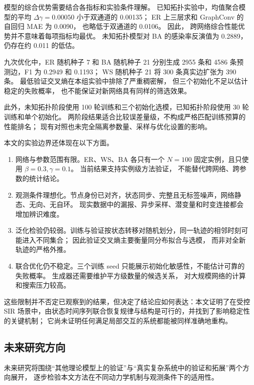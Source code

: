 模型的综合优势需要结合各指标和实验条件理解。
已知拓扑实验中，均值聚合模型的平均 $\Delta\gamma=0.00050$ 小于双通道的 0.00135；
ER 上三层求和 GraphConv 的自回归 MAE 为 0.0090，
也略低于双通道的 0.0106。
因此，
跨网络综合性能优势并不意味着每项指标均最优。
未知拓扑模型对 BA 的感染率反演值为 0.2889，
仍存在约 0.011 的低估。

九次优化中，ER 随机种子 7 和 BA 随机种子 21 分别生成 2955 条和 4586 条预测边，F1 为 0.2949 和 0.1193；
WS 随机种子 21 将 300 条真实边扩张为 390 条。
最低验证交叉熵在本组实验中排除了严重稠密解，
但三个初始化不足以估计稳定的失败概率，
也不能保证对新网络具有同样的筛选效果。

此外，未知拓扑阶段使用 100 轮训练和三个初始化选模，已知拓扑阶段使用 30 轮训练和单个初始化。
两阶段结果适合比较误差量级，不构成严格匹配训练预算的性能排名；
现有对照也未完全隔离参数量、采样与优化设置的影响。

本文的实验边界还体现在以下方面。
\begin{enumerate}
  \item {\yahei 网络与参数范围有限。}ER、WS、BA 各只有一个 $N=100$ 固定实例，且只使用 $\beta=0.3,\gamma=0.1$。
当前结果支持实例级方法验证，
不能替代跨网络、跨参数的统计结论。
  \item {\yahei 观测条件理想化。}节点身份已对齐，状态同步、完整且无标签噪声，网络静态、无向、无自环。
现实数据中的漏报、异步采样、潜变量和时变连接都会增加辨识难度。
  \item {\yahei 泛化检验仍较弱。}训练与验证按状态转移对随机划分，同一轨迹的相邻时刻可能进入不同集合；
因此验证交叉熵主要衡量同分布拟合与选模，
而非对全新轨迹的严格外推。
  \item {\yahei 联合优化仍不稳定。}三个训练 seed 只能展示初始化敏感性，不能估计可靠的失败概率。
生成器还需要维护平方级数量的候选关系，
对大规模网络的计算和搜索压力较高。
\end{enumerate}

这些限制并不否定已观察到的结果，但决定了结论应如何表达：本文证明了在受控 SIR 场景中，由状态时间序列联合恢复规律与结构是可行的，并找到了影响稳定性的关键机制；
它尚未证明任何满足局部交互的系统都能被同样准确地重构。

\subsection{未来研究方向}

未来研究将围绕“其他理论模型上的验证”与“真实复杂系统中的验证和拓展”两个方向展开，
逐步检验本文方法在不同动力学机制与观测条件下的适用性。

